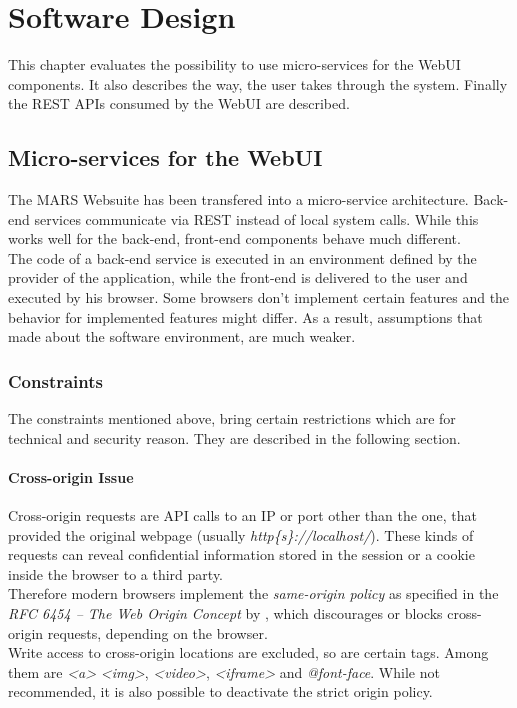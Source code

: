 
\chapter{Software Design}
This chapter evaluates the possibility to use micro-services for the WebUI components. It also describes the way, the user takes through the system. Finally the REST APIs consumed by the WebUI are described.



\section{Micro-services for the WebUI}
\label{sec:MS_for_WebUI}
The MARS Websuite has been transfered into a micro-service architecture. Back-end services communicate via REST instead of local system calls. While this works well for the back-end, front-end components behave much different.\\
The code of a back-end service is executed in an environment defined by the provider of the application, while the front-end is delivered to the user and executed by his browser. Some browsers don't implement certain features and the behavior for implemented features might differ. As a result, assumptions that made about the software environment, are much weaker. 


\subsection{Constraints}
The constraints mentioned above, bring certain restrictions which are for technical and security reason. They are described in the following section.

\subsubsection{Cross-origin Issue}
Cross-origin requests are API calls to an IP or port other than the one, that provided the original webpage (usually \textit{http\{s\}://localhost/}). These kinds of requests can reveal confidential information stored in the session or a cookie inside the browser to a third party.\\
Therefore modern browsers implement the \textit{same-origin policy} as specified in the \textit{RFC 6454 -- The Web Origin Concept} by \cite{barth2011web}, which discourages or blocks cross-origin requests, depending on the browser.\\
Write access to cross-origin locations are excluded, so are certain tags. Among them are \textit{<a>} \textit{<img>}, \textit{<video>}, \textit{<iframe>} and \textit{@font-face}. While not recommended, it is also possible to deactivate the strict origin policy.

